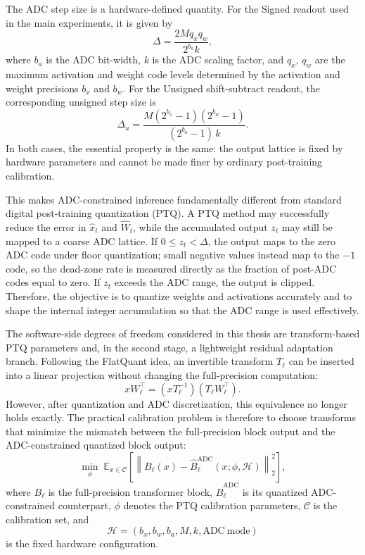 \documentclass[a4paper,11pt,oneside]{article}
\theoremstyle{breakstyle}
\begin{document}
The ADC step size is a hardware-defined quantity. For the Signed readout used in the main experiments, it is given by
\begin{equation}
    \Delta
    =
    \frac{2 M q_x q_w}{2^{b_a} k},
\end{equation}
where \(b_a\) is the ADC bit-width, \(k\) is the ADC scaling factor, and \(q_x\), \(q_w\) are the maximum activation and weight code levels determined by the activation and weight precisions \(b_x\) and \(b_w\). For the Unsigned shift-subtract readout, the corresponding unsigned step size is
\begin{equation}
    \Delta_u
    =
    \frac{M(2^{b_x}-1)(2^{b_w}-1)}{(2^{b_a}-1)\,k}.
\end{equation}
In both cases, the essential property is the same: the output lattice is fixed by hardware parameters and cannot be made finer by ordinary post-training calibration.

This makes ADC-constrained inference fundamentally different from standard digital post-training quantization (PTQ). A PTQ method may successfully reduce the error in \(\hat{x}_t\) and \(\hat{W}_t\), while the accumulated output \(z_t\) may still be mapped to a coarse ADC lattice. If \(0 \le z_t < \Delta\), the output maps to the zero ADC code under floor quantization; small negative values instead map to the $-1$ code, so the dead-zone rate is measured directly as the fraction of post-ADC codes equal to zero. If \(z_t\) exceeds the ADC range, the output is clipped. Therefore, the objective is to quantize weights and activations accurately and to shape the internal integer accumulation so that the ADC range is used effectively.

The software-side degrees of freedom considered in this thesis are transform-based PTQ parameters and, in the second stage, a lightweight residual adaptation branch. Following the FlatQuant idea, an invertible transform \(T_\ell\) can be inserted into a linear projection without changing the full-precision computation:
\begin{equation}
    x W_\ell^\top
    =
    (x T_\ell^{-1})(T_\ell W_\ell^\top).
\end{equation}
However, after quantization and ADC discretization, this equivalence no longer holds exactly. The practical calibration problem is therefore to choose transforms that minimize the mismatch between the full-precision block output and the ADC-constrained quantized block output:
\begin{equation}
    \min_{\phi}
    \;
    \mathbb{E}_{x \in \mathcal{C}}
    \left[
        \left\|
            B_\ell(x)
            -
            \hat{B}^{\mathrm{ADC}}_\ell(x; \phi, \mathcal{H})
        \right\|_2^2
    \right],
\end{equation}
where \(B_\ell\) is the full-precision transformer block, \(\hat{B}^{\mathrm{ADC}}_\ell\) is its quantized ADC-constrained counterpart, \(\phi\) denotes the PTQ calibration parameters, \(\mathcal{C}\) is the calibration set, and
\begin{equation}
    \mathcal{H} = (b_x, b_w, b_a, M, k, \mathrm{ADC\ mode})
\end{equation}
is the fixed hardware configuration.
\end{document}
